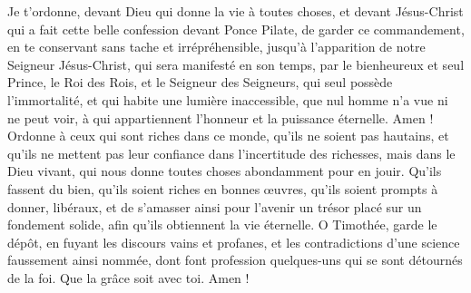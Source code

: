 \begin{multicols}{2}
Je t'ordonne, devant Dieu qui donne la vie à toutes choses, et devant Jésus-Christ qui a fait cette belle confession devant Ponce Pilate,
de garder ce commandement, en te conservant sans tache et irrépréhensible, jusqu’à l'apparition de notre Seigneur Jésus-Christ,
qui sera manifesté en son temps, par le bienheureux et seul Prince, le Roi des Rois, et le Seigneur des Seigneurs,
qui seul possède l'immortalité, et qui habite une lumière inaccessible, que nul homme n'a vue ni ne peut voir, à qui appartiennent l'honneur et la puissance éternelle. Amen !
Ordonne à ceux qui sont riches dans ce monde, qu'ils ne soient pas hautains, et qu'ils ne mettent pas leur confiance dans l'incertitude des richesses, mais dans le Dieu vivant, qui nous donne toutes choses abondamment pour en jouir.
Qu'ils fassent du bien, qu'ils soient riches en bonnes œuvres, qu'ils soient prompts à donner, libéraux,
et de s’amasser ainsi pour l'avenir un trésor placé sur un fondement solide, afin qu'ils obtiennent la vie éternelle.
\TextTitle{[Conclusion]}
O Timothée, garde le dépôt, en fuyant les discours vains et profanes, et les contradictions d'une science faussement ainsi nommée,
dont font profession quelques-uns qui se sont détournés de la foi. Que la grâce soit avec toi. Amen !
\PPE{}
\end{multicols}
